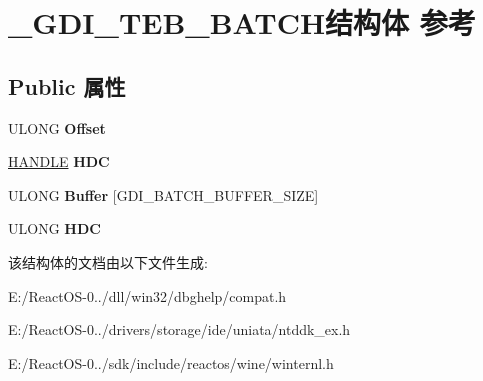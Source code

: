 \hypertarget{struct___g_d_i___t_e_b___b_a_t_c_h}{}\section{\+\_\+\+G\+D\+I\+\_\+\+T\+E\+B\+\_\+\+B\+A\+T\+C\+H结构体 参考}
\label{struct___g_d_i___t_e_b___b_a_t_c_h}
\subsection*{Public 属性}
\begin{DoxyCompactItemize}
\item 
\mbox{\label{struct___g_d_i___t_e_b___b_a_t_c_h_acbf27f45b3f93297f0eaa9b0dd24ed06}} 
U\+L\+O\+NG {\bfseries Offset}
\item 
\mbox{\label{struct___g_d_i___t_e_b___b_a_t_c_h_a9750b458f5aab84d9f0ad4675b9c0502}} 
\hyperlink{interfacevoid}{H\+A\+N\+D\+LE} {\bfseries H\+DC}
\item 
\mbox{\label{struct___g_d_i___t_e_b___b_a_t_c_h_a6393e0d229396ad52f282ba39233c639}} 
U\+L\+O\+NG {\bfseries Buffer} \mbox{[}G\+D\+I\+\_\+\+B\+A\+T\+C\+H\+\_\+\+B\+U\+F\+F\+E\+R\+\_\+\+S\+I\+ZE\mbox{]}
\item 
\mbox{\label{struct___g_d_i___t_e_b___b_a_t_c_h_a1dfeeb0296629bad703f66fa01ecac4e}} 
U\+L\+O\+NG {\bfseries H\+DC}
\end{DoxyCompactItemize}


该结构体的文档由以下文件生成\+:\begin{DoxyCompactItemize}
\item 
E\+:/\+React\+O\+S-\/0../dll/win32/dbghelp/compat.\+h\item 
E\+:/\+React\+O\+S-\/0../drivers/storage/ide/uniata/ntddk\+\_\+ex.\+h\item 
E\+:/\+React\+O\+S-\/0../sdk/include/reactos/wine/winternl.\+h\end{DoxyCompactItemize}
